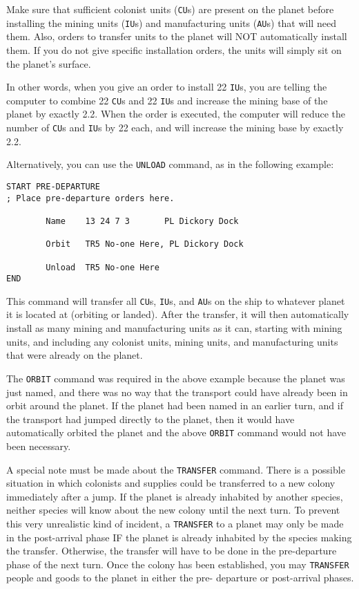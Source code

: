 \documentclass[10pt,titlepage]{article}
\begin{document}
Make sure that sufficient colonist units (\texttt{CU}s) are present on the planet before
installing the mining units (\texttt{IU}s) and manufacturing units (\texttt{AU}s) that will need
them.  Also, orders to transfer units to the planet will NOT automatically
install them.  If you do not give specific installation orders, the units
will simply sit on the planet's surface.

In other words, when you give an order to install 22 \texttt{IU}s, you are telling the
computer to combine 22 \texttt{CU}s and 22 \texttt{IU}s and increase the mining base of the
planet by exactly 2.2.  When the order is executed, the computer will reduce
the number of \texttt{CU}s and \texttt{IU}s by 22 each, and will increase the mining base by
exactly 2.2.

Alternatively, you can use the \texttt{UNLOAD} command, as in the following example:

\begin{verbatim}
START PRE-DEPARTURE
; Place pre-departure orders here.

        Name    13 24 7 3       PL Dickory Dock

        Orbit   TR5 No-one Here, PL Dickory Dock

        Unload  TR5 No-one Here
END\end{verbatim} 

This command will transfer all \texttt{CU}s, \texttt{IU}s, and \texttt{AU}s on the ship to whatever planet
it is located at (orbiting or landed).  After the transfer, it will then
automatically install as many mining and manufacturing units as it can,
starting with mining units, and including any colonist units, mining units,
and manufacturing units that were already on the planet.

The \texttt{ORBIT} command was required in the above example because the planet was just
named, and there was no way that the transport could have already been in orbit
around the planet.  If the planet had been named in an earlier turn, and if the
transport had jumped directly to the planet, then it would have automatically
orbited the planet and the above \texttt{ORBIT} command would not have been necessary.

A special note must be made about the \texttt{TRANSFER} command.  There is a possible
situation in which colonists and supplies could be transferred to a new colony
immediately after a jump.  If the planet is already inhabited by another
species, neither species will know about the new colony until the next turn.
To prevent this very unrealistic kind of incident, a \texttt{TRANSFER} to a planet may
only be made in the post-arrival phase IF the planet is already inhabited by
the species making the transfer.  Otherwise, the transfer will have to be
done in the pre-departure phase of the next turn.  Once the colony has been
established, you may \texttt{TRANSFER} people and goods to the planet in either the pre-
departure or post-arrival phases.
\end{document}
